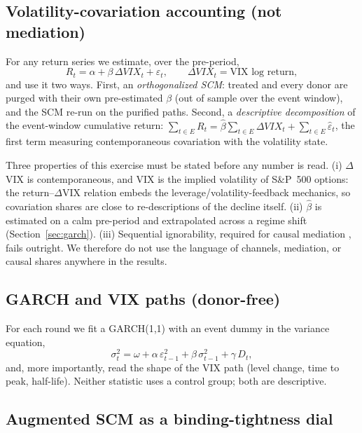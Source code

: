 \documentclass[11pt,a4paper]{article}
\begin{document}
\subsection{Volatility-covariation accounting (not mediation)}
\label{sec:covar-method}

For any return series we estimate, over the pre-period,
\begin{equation}
R_{t} = \alpha + \beta\, \Delta VIX_{t} + \varepsilon_{t},
\qquad \Delta VIX_t = \text{VIX log return},
\label{eq:vixreg}
\end{equation}
and use it two ways. First, an \emph{orthogonalized SCM}: treated and every
donor are purged with their own pre-estimated $\beta$ (out of sample over
the event window), and the SCM re-run on the purified paths. Second, a
\emph{descriptive decomposition} of the event-window cumulative return:
$\sum_{t\in E} R_t = \hat\beta \sum_{t\in E}\Delta VIX_t
+ \sum_{t\in E}\hat\varepsilon_t$, the first term measuring contemporaneous
covariation with the volatility state.

Three properties of this exercise must be stated before any number is
read. (i) $\Delta$VIX is contemporaneous, and VIX is the implied volatility
of S\&P~500 options: the return--$\Delta$VIX relation embeds the
leverage/volatility-feedback mechanics, so covariation shares are close to
re-descriptions of the decline itself. (ii) $\hat\beta$ is estimated on a
calm pre-period and extrapolated across a regime shift
(Section~\ref{sec:garch}). (iii) Sequential ignorability, required for
causal mediation \citep{imai2010}, fails outright. We therefore do not use
the language of channels, mediation, or causal shares anywhere in the
results.

\subsection{GARCH and VIX paths (donor-free)}

For each round we fit a GARCH(1,1) with an event dummy in the variance
equation,
\begin{equation}
\sigma_t^2 = \omega + \alpha\,\varepsilon_{t-1}^2 + \beta\,\sigma_{t-1}^2
+ \gamma\, D_t ,
\label{eq:garch}
\end{equation}
and, more importantly, read the shape of the VIX path (level change, time
to peak, half-life). Neither statistic uses a control group; both are
descriptive.

\subsection{Augmented SCM as a binding-tightness dial}\label{sec:ascm-method}
\end{document}
